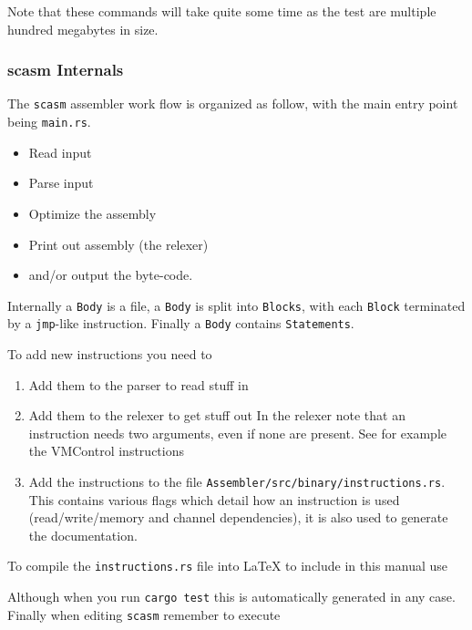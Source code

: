 Note that these commands will take quite some time as the test are multiple hundred megabytes in size.

\subsubsection{scasm Internals}
The \verb+scasm+ assembler work flow is organized as follow, with the main entry point
being \verb+main.rs+.
\begin{itemize}
\item Read input
\item Parse input
\item Optimize the assembly
\item Print out assembly (the relexer)
\item and/or output the byte-code.
\end{itemize}
Internally a \verb+Body+ is a file, a \verb+Body+ is split into
\verb+Blocks+, with each \verb+Block+ terminated by a \verb+jmp+-like instruction.
Finally a \verb+Body+ contains \verb+Statements+.

\vspace{5mm}

\noindent To add new instructions you need to
\begin{enumerate}
\item Add them to the parser to read stuff in
\item Add them to the relexer to get stuff out
      In the relexer note that an instruction needs two arguments,
      even if none are present. See for example the VMControl
      instructions

\item Add the instructions to the file \verb+Assembler/src/binary/instructions.rs+.
      This contains various flags which detail how an instruction is used
      (read/write/memory and channel dependencies), it is also used to generate
      the documentation.
\end{enumerate}
To compile the \verb+instructions.rs+ file into LaTeX to include in
this manual use


\noindent Although when you run \verb+cargo test+ this is automatically
generated in any case. \\

\noindent
Finally when editing \verb+scasm+ remember to execute

